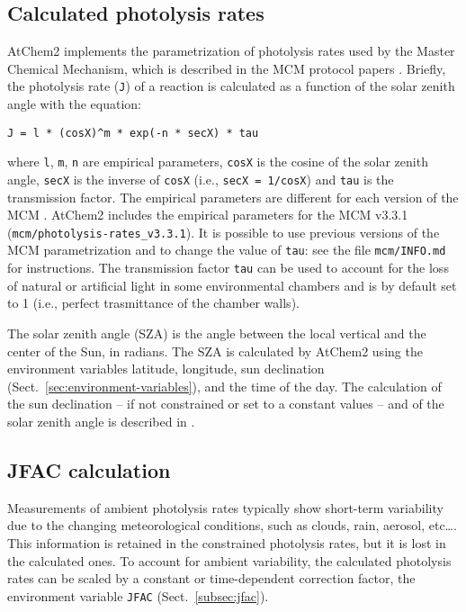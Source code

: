 \subsection{Calculated photolysis rates} \label{subsec:calculated-photolysis-rates}

AtChem2 implements the parametrization of photolysis rates used by the
Master Chemical Mechanism, which is described in the MCM protocol
papers \citep{jenkin_1997, saunders_2003}. Briefly, the photolysis
rate (\texttt{J}) of a reaction is calculated as a function of the
solar zenith angle with the equation:

\begin{verbatim}
J = l * (cosX)^m * exp(-n * secX) * tau
\end{verbatim}

where \texttt{l}, \texttt{m}, \texttt{n} are empirical parameters,
\texttt{cosX} is the cosine of the solar zenith angle, \texttt{secX}
is the inverse of \texttt{cosX} (i.e., \texttt{secX\ =\ 1/cosX}) and
\texttt{tau} is the transmission factor. The empirical parameters are
different for each version of the MCM \citep{sommariva_2019}. AtChem2
includes the empirical parameters for the MCM v3.3.1
(\texttt{mcm/photolysis-rates\_v3.3.1}). It is possible to use
previous versions of the MCM parametrization and to change the value
of \texttt{tau}: see the file \texttt{mcm/INFO.md} for
instructions. The transmission factor \texttt{tau} can be used to
account for the loss of natural or artificial light in some
environmental chambers and is by default set to 1 (i.e., perfect
trasmittance of the chamber walls).

The solar zenith angle (SZA) is the angle between the local vertical
and the center of the Sun, in radians. The SZA is calculated by
AtChem2 using the environment variables latitude, longitude, sun
declination (Sect.~\ref{sec:environment-variables}), and the time of
the day. The calculation of the sun declination -- if not constrained
or set to a constant values -- and of the solar zenith angle is
described in \citet{madronich_1993}.

\subsection{JFAC calculation} \label{subsec:jfac-calculation}

Measurements of ambient photolysis rates typically show short-term
variability due to the changing meteorological conditions, such as
clouds, rain, aerosol, etc\ldots. This information is retained in the
constrained photolysis rates, but it is lost in the calculated
ones. To account for ambient variability, the calculated photolysis
rates can be scaled by a constant or time-dependent correction factor,
the environment variable \texttt{JFAC} (Sect.~\ref{subsec:jfac}).

